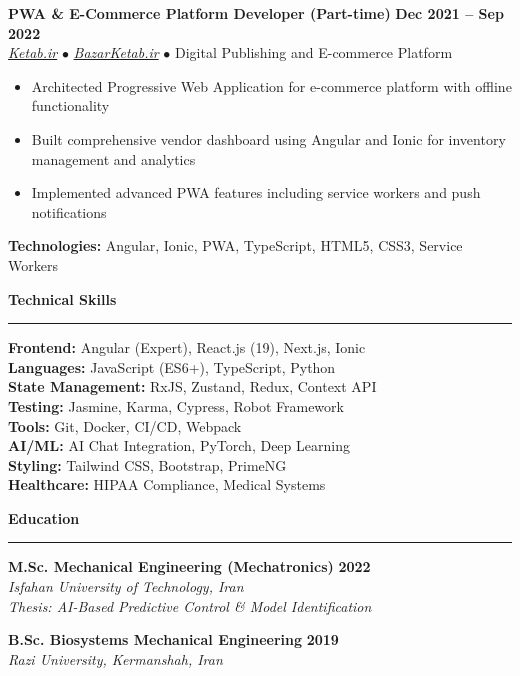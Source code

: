 \documentclass[a4paper,10pt]{article}
\newcommand{\sectionheader}[1]{\vspace{6pt}\textbf{\large\color{headercolor}#1}\vspace{1pt}\hrule\vspace{4pt}}
\newcommand{\jobtitle}[1]{\textbf{#1}}
\newcommand{\company}[1]{\textit{\color{headercolor}#1}}
\begin{document}
\vspace{12pt}
\jobtitle{PWA \& E-Commerce Platform Developer (Part-time)} \hfill \textbf{Dec 2021 -- Sep 2022} \\
\href{https://ketab.ir/}{\company{Ketab.ir}} $\bullet$ \href{https://bazarketab.ir/}{\company{BazarKetab.ir}} $\bullet$ Digital Publishing and E-commerce Platform \\
\vspace{-10pt}
\begin{itemize}[leftmargin=15pt, itemsep=2pt, parsep=0pt, topsep=3pt]
    \item Architected Progressive Web Application for e-commerce platform with offline functionality
    \item Built comprehensive vendor dashboard using Angular and Ionic for inventory management and analytics
    \item Implemented advanced PWA features including service workers and push notifications
\end{itemize}
\vspace{-1pt}
\textbf{Technologies:} Angular, Ionic, PWA, TypeScript, HTML5, CSS3, Service Workers

\begin{multicols}{2}

\sectionheader{Technical Skills}
\textbf{Frontend:} Angular (Expert), React.js (19), Next.js, Ionic \\
\textbf{Languages:} JavaScript (ES6+), TypeScript, Python \\
\textbf{State Management:} RxJS, Zustand, Redux, Context API \\
\textbf{Testing:} Jasmine, Karma, Cypress, Robot Framework \\
\textbf{Tools:} Git, Docker, CI/CD, Webpack \\
\textbf{AI/ML:} AI Chat Integration, PyTorch, Deep Learning \\
\textbf{Styling:} Tailwind CSS, Bootstrap, PrimeNG \\
\textbf{Healthcare:} HIPAA Compliance, Medical Systems

\columnbreak

\sectionheader{Education}
\jobtitle{M.Sc. Mechanical Engineering (Mechatronics)} \hfill \textbf{2022} \\
\company{Isfahan University of Technology, Iran} \\
\textit{Thesis: AI-Based Predictive Control \& Model Identification}

\vspace{4pt}
\jobtitle{B.Sc. Biosystems Mechanical Engineering} \hfill \textbf{2019} \\
\company{Razi University, Kermanshah, Iran}

\end{multicols}
\end{document}
